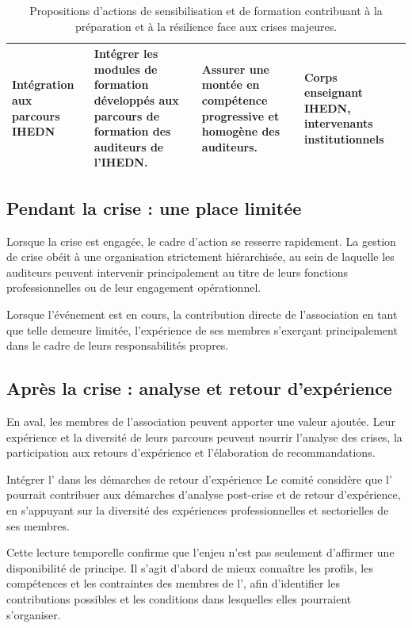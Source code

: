 \begin{table}[H]
{\begin{tabular}{@{}>{\raggedright\arraybackslash}p{3.2cm}>{\raggedright\arraybackslash}p{6.2cm}>{\raggedright\arraybackslash}p{4.5cm}>{\raggedright\arraybackslash}p{4.5cm}@{}}
\addlinespace

Intégration aux parcours IHEDN &
Intégrer les modules de formation développés aux parcours de formation des auditeurs de l'IHEDN. &
Assurer une montée en compétence progressive et homogène des auditeurs. &
Corps enseignant IHEDN, intervenants institutionnels \\

\bottomrule
\end{tabular}
}

\caption[Propositions d'actions de sensibilisation et de formation]{Propositions d'actions de sensibilisation et de formation contribuant à la préparation et à la résilience face aux crises majeures.}
\label{tab:sensibilisation_resilience}

\end{table}

\subsection{Pendant la crise : une place limitée}

Lorsque la crise est engagée, le cadre d'action se resserre rapidement. La gestion de crise obéit à une organisation strictement hiérarchisée, au sein de laquelle les auditeurs peuvent intervenir principalement au titre de leurs fonctions professionnelles ou de leur engagement opérationnel.

Lorsque l'événement est en cours, la contribution directe de l'association en tant que telle demeure limitée, l'expérience de ses membres s'exerçant principalement dans le cadre de leurs responsabilités propres.

\subsection{Après la crise : analyse et retour d'expérience}

En aval, les membres de l'association peuvent apporter une valeur ajoutée. Leur expérience et la diversité de leurs parcours peuvent nourrir l'analyse des crises, la participation aux retours d'expérience et l'élaboration de recommandations.

\begin{proposition}{Intégrer l'\ARSeize{} dans les démarches de retour d'expérience}
Le comité considère que l'\ARSeize{} pourrait contribuer aux démarches d'analyse post-crise et de retour d'expérience, en s'appuyant sur la diversité des expériences professionnelles et sectorielles de ses membres.
\end{proposition}

Cette lecture temporelle confirme que l'enjeu n'est pas seulement d'affirmer une disponibilité de principe. Il s'agit d'abord de mieux connaître les profils, les compétences et les contraintes des membres de l'\ARSeize, afin d'identifier les contributions possibles et les conditions dans lesquelles elles pourraient s'organiser.

